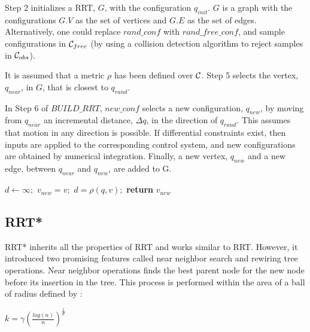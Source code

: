 \documentclass[runningheads]{llncs}
\begin{document}
Step 2 initializes a RRT, $G$, with the configuration $q_{init}$. $G$ is a graph with the configurations $G.V$ as the set of vertices and $G.E$ as the set of edges.
Alternatively, one could replace $rand\_conf$ with $rand\_free\_conf$, and sample configurations in ${\cal C}_{free}$ (by using a collision detection algorithm to reject samples in ${\cal C}_{obs}$).

It is assumed that a metric $\rho$ has been defined over ${\cal C}$. Step 5 selects the vertex, $q_{near}$, in $G$, that is closest to $q_{rand}$.

In Step 6 of $BUILD\_RRT$, $new\_conf$ selects a new configuration, $q_{new}$, by moving from $q_{near}$ an incremental distance, $\Delta q$, in the direction of $q_{rand}$. This assumes that motion in any direction is possible. If differential constraints exist, then inputs are applied to the corresponding control system, and new configurations are obtained by numerical integration. Finally, a new vertex, $q_{new}$ and a new edge, between $q_{near}$ and $q_{new}$, are added to G.




\begin{algorithm}
\caption{NEAREST\_VERTEX}\label{RRT}
\begin{algorithmic}[1]
\State $d\gets \infty;$
\State $v_{new} = v;$
\State $d = \rho(q,v);$
\EndIf
\EndFor
\State \textbf{return} $v_{new}$
\EndProcedure
\end{algorithmic}
\end{algorithm}

\vspace{100mm}  
\subsection{RRT*}
RRT*\cite{IJACSA} inherits all the properties of RRT and works similar to  RRT.  However,  it  introduced  two  promising  features called near  neighbor  search  and rewiring  tree operations.  Near  neighbor  operations finds  the  best  parent  node  for the new node before its insertion in the tree. This process is performed within the area of a ball of radius defined by :

\vspace{3mm}

$k = \gamma (\frac{log(n)}{n})^{ \frac{1}{d} } $

\vspace{3mm}
\end{document}
